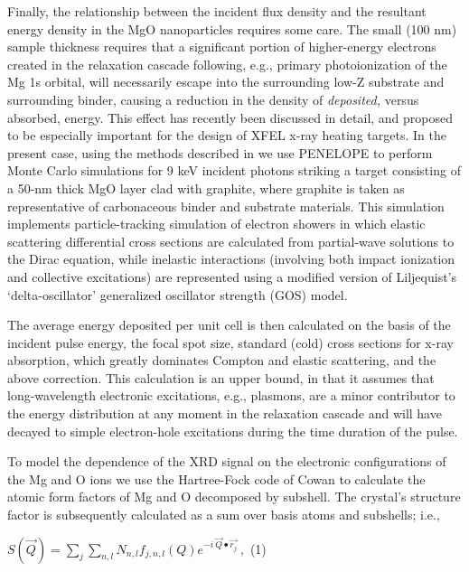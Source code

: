 Finally, the relationship between the incident flux density and the
resultant energy density in the MgO nanoparticles requires some care.
The small (100 nm) sample thickness requires that a significant portion
of higher-energy electrons created in the relaxation cascade following,
e.g., primary photoionization of the Mg 1s orbital, will necessarily
escape into the surrounding low-Z substrate and surrounding binder,
causing a reduction in the density of \emph{deposited,} versus absorbed,
energy. This effect has recently been discussed in detail, and proposed
to be especially important for the design of XFEL x-ray heating targets.
In the present case, using the methods described in  we use
PENELOPE to perform Monte Carlo simulations for 9 keV incident photons
striking a target consisting of a 50-nm thick MgO layer clad with
graphite, where graphite is taken as representative of carbonaceous
binder and substrate materials. This simulation implements
particle-tracking simulation of electron showers in which elastic
scattering differential cross sections are calculated from partial-wave
solutions to the Dirac equation, while inelastic interactions (involving
both impact ionization and collective excitations) are represented using
a modified version of Liljequist's `delta-oscillator' generalized
oscillator strength (GOS) model. 

The average energy deposited per unit cell is then calculated on the
basis of the incident pulse energy, the focal spot size, standard (cold)
cross sections for x-ray absorption, which greatly dominates Compton and
elastic scattering, and the above correction. This calculation is an
upper bound, in that it assumes that long-wavelength electronic
excitations, e.g., plasmons, are a minor contributor to the energy
distribution at any moment in the relaxation cascade and will have
decayed to simple electron-hole excitations during the time duration of
the pulse.

To model the dependence of the XRD signal on the electronic
configurations of the Mg and O ions we use the Hartree-Fock code of
Cowan \cite{ABDALLAH1988THEORETICAL} to calculate the atomic form factors of Mg and O
decomposed by subshell. The crystal's structure factor is subsequently
calculated as a sum over basis atoms and subshells; i.e.,

\(S\left( \overrightarrow{Q} \right) = \sum_{j}^{}{\sum_{n,l}N_{n,l}f_{j,n,l}\left( Q \right)e^{- i\ \overrightarrow{Q} \bullet \overrightarrow{r_{j}}}\ },\)
(1)

